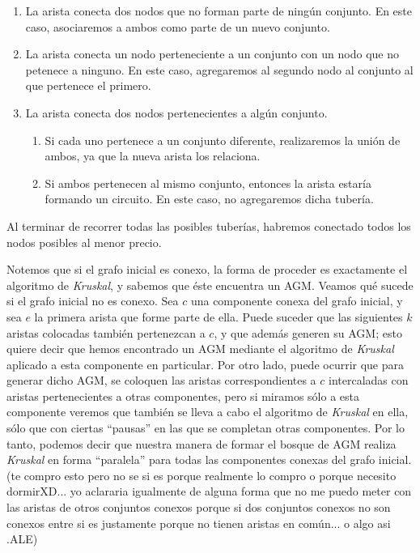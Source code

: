 \begin{enumerate}
	\item La arista conecta dos nodos que no forman parte de ningún conjunto.  En este caso, asociaremos a ambos como parte de un nuevo conjunto.
	\item La arista conecta un nodo perteneciente a un conjunto con un nodo que no petenece a ninguno.  En este caso, agregaremos al segundo nodo al conjunto al que pertenece el primero.
	\item La arista conecta dos nodos pertenecientes a algún conjunto.
	
	\begin{enumerate}
		\item Si cada uno pertenece a un conjunto diferente, realizaremos la unión de ambos, ya que la nueva arista los relaciona.
		\item Si ambos pertenecen al mismo conjunto, entonces la arista estaría formando un circuito.  En este caso, no agregaremos dicha tubería.
	\end{enumerate}
\end{enumerate}

Al terminar de recorrer todas las posibles tuberías, habremos conectado todos los nodos posibles al menor precio.

Notemos que si el grafo inicial es conexo, la forma de proceder es exactamente el algoritmo de {\it Kruskal}, y sabemos que éste encuentra un AGM.  Veamos qué sucede si el grafo inicial no es conexo.  Sea $c$ una componente conexa del grafo inicial, y sea $e$ la primera arista que forme parte de ella.  Puede suceder que las siguientes $k$ aristas colocadas también pertenezcan a $c$, y que además generen su AGM; esto quiere decir que hemos encontrado un AGM mediante el algoritmo de {\it Kruskal} aplicado a esta componente en particular.  Por otro lado, puede ocurrir que para generar dicho AGM, se coloquen las aristas correspondientes a $c$ intercaladas con aristas pertenecientes a otras componentes, pero si miramos sólo a esta componente veremos que también se lleva a cabo el algoritmo de {\it Kruskal} en ella, sólo que con ciertas ``pausas'' en las que se completan otras componentes.  Por lo tanto, podemos decir que nuestra manera de formar el bosque de AGM realiza {\it Kruskal} en forma ``paralela'' para todas las componentes conexas del grafo inicial.
(te compro esto pero no se si es porque realmente lo compro o porque necesito dormirXD... yo aclararia igualmente de alguna forma que no me puedo meter con las aristas de otros conjuntos conexos porque si dos conjuntos conexos no son conexos entre si es justamente porque no tienen aristas en común... o algo asi .ALE)

